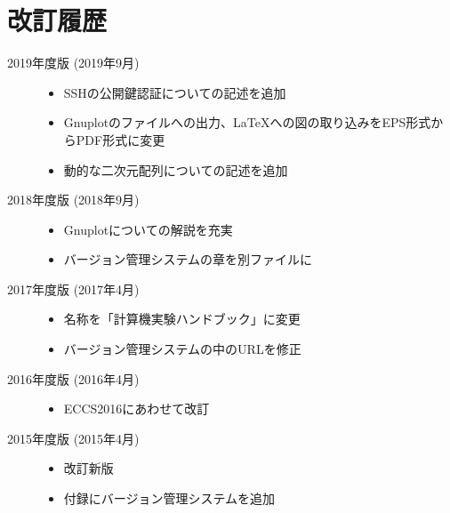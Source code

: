 \section*{改訂履歴}

\noindent
\begin{description}
\item[2019年度版 (2019年9月)] \mbox{}
  
  \begin{itemize}
  \item SSHの公開鍵認証についての記述を追加
  \item Gnuplotのファイルへの出力、\LaTeX への図の取り込みをEPS形式からPDF形式に変更
  \item 動的な二次元配列についての記述を追加
  \end{itemize}

\item[2018年度版 (2018年9月)] \mbox{}
  
  \begin{itemize}
  \item Gnuplotについての解説を充実
  \item バージョン管理システムの章を別ファイルに
  \end{itemize}

\item[2017年度版 (2017年4月)] \mbox{}
  
  \begin{itemize}
  \item 名称を「計算機実験ハンドブック」に変更
  \item バージョン管理システムの中のURLを修正
  \end{itemize}

\item[2016年度版 (2016年4月)] \mbox{}

  \begin{itemize}
  \item ECCS2016にあわせて改訂
  \end{itemize}

\item[2015年度版 (2015年4月)] \mbox{}

  \begin{itemize}
  \item 改訂新版
  \item 付録にバージョン管理システムを追加
  \end{itemize}

\end{description}
